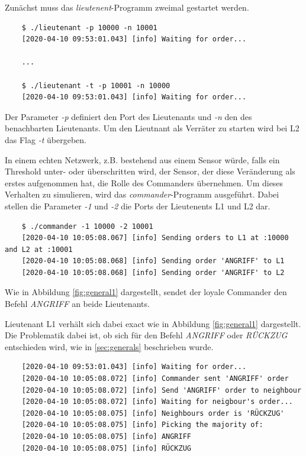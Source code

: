 \documentclass{article}
\begin{document}
\medskip 

Zunächst muss das \textit{lieutenent}-Programm zweimal gestartet werden. 

\begin{center}
    \begin{verbatim}
    $ ./lieutenant -p 10000 -n 10001
    [2020-04-10 09:53:01.043] [info] Waiting for order...

    ...

    $ ./lieutenant -t -p 10001 -n 10000
    [2020-04-10 09:53:01.043] [info] Waiting for order...
    \end{verbatim}
\end{center}

Der Parameter \textit{-p} definiert den Port des Lieutenants und
\textit{-n} den des benachbarten Lieutenants. Um den Lieutnant als 
Verräter zu starten wird bei L2 das Flag \textit{-t} übergeben. 

\medskip 

In einem echten Netzwerk, z.B. bestehend aus einem Sensor würde, falls ein Threshold 
unter- oder überschritten wird, der Sensor, der diese Veränderung als erstes aufgenommen hat,
die Rolle des Commanders übernehmen. Um dieses Verhalten zu simulieren, wird das 
\textit{commander}-Programm ausgeführt. Dabei stellen die Parameter \textit{-1} und \textit{-2} die Ports
der Lieutenents L1 und L2 dar. 

\begin{center}
    \begin{verbatim}
    $ ./commander -1 10000 -2 10001
    [2020-04-10 10:05:08.067] [info] Sending orders to L1 at :10000 and L2 at :10001
    [2020-04-10 10:05:08.068] [info] Sending order 'ANGRIFF' to L1
    [2020-04-10 10:05:08.068] [info] Sending order 'ANGRIFF' to L2
    \end{verbatim}
\end{center}

Wie in Abbildung \ref{fig:general1} dargestellt, sendet der loyale Commander den Befehl 
\textit{ANGRIFF} an beide Lieutenants.

\medskip 

Lieutenant L1 verhält sich dabei exact wie in Abbildung \ref{fig:general1} dargestellt. 
Die Problematik dabei ist, ob sich für den Befehl \textit{ANGRIFF} oder \textit{RÜCKZUG} 
entschieden wird, wie in \ref{sec:generals} beschrieben wurde.

\begin{center}
    \begin{verbatim}
    [2020-04-10 09:53:01.043] [info] Waiting for order...
    [2020-04-10 10:05:08.072] [info] Commander sent 'ANGRIFF' order
    [2020-04-10 10:05:08.072] [info] Send 'ANGRIFF' order to neighbour
    [2020-04-10 10:05:08.072] [info] Waiting for neigbour's order...
    [2020-04-10 10:05:08.075] [info] Neighbours order is 'RÜCKZUG'
    [2020-04-10 10:05:08.075] [info] Picking the majority of:
    [2020-04-10 10:05:08.075] [info] ANGRIFF
    [2020-04-10 10:05:08.075] [info] RÜCKZUG
    \end{verbatim}
\end{center}
\end{document}
